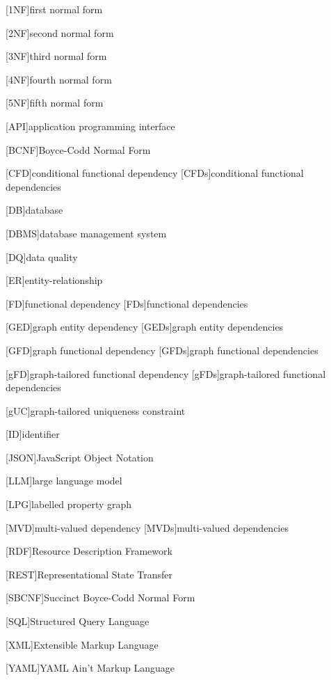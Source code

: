 \begin{acronym}

[1NF]{first normal form}

[2NF]{second normal form}

[3NF]{third normal form}

[4NF]{fourth normal form}

[5NF]{fifth normal form}

[API]{application programming interface}

[BCNF]{Boyce-Codd Normal Form}

[CFD]{conditional functional dependency}
[CFDs]{conditional functional dependencies}

[DB]{database}

[DBMS]{database management system}

[DQ]{data quality}

[ER]{entity-relationship}

[FD]{functional dependency}
[FDs]{functional dependencies}

[GED]{graph entity dependency}
[GEDs]{graph entity dependencies}


[GFD]{graph functional dependency}
[GFDs]{graph functional dependencies}

[gFD]{graph-tailored functional dependency}
[gFDs]{graph-tailored functional dependencies}

[gUC]{graph-tailored uniqueness constraint}

[ID]{identifier}

[JSON]{JavaScript Object Notation}

[LLM]{large language model}

[LPG]{labelled property graph}

[MVD]{multi-valued dependency}
[MVDs]{multi-valued dependencies}

[RDF]{Resource Description Framework}

[REST]{Representational State Transfer}

[SBCNF]{Succinct Boyce-Codd Normal Form} %

[SQL]{Structured Query Language}

[XML]{Extensible Markup Language}

[YAML]{YAML Ain't Markup Language}

\end{acronym}

